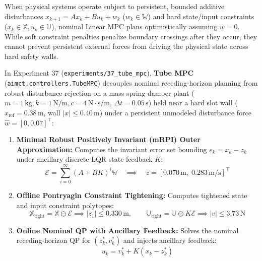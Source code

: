 \documentclass[11pt,a4paper]{article}
\begin{document}
When physical systems operate subject to persistent, bounded additive disturbances $x_{k+1} = A x_k + B u_k + w_k$ ($w_k \in \mathbb{W}$) and hard state/input constraints ($x_k \in \mathbb{X}, u_k \in \mathbb{U}$), nominal Linear MPC plans optimistically assuming $w=0$. While soft constraint penalties penalize boundary crossings after they occur, they cannot prevent persistent external forces from driving the physical state across hard safety walls.

In Experiment 37 (\texttt{experiments/37\_tube\_mpc}), \textbf{Tube MPC} (\texttt{aimct.controllers.TubeMPC}) decouples nominal receding-horizon planning from robust disturbance rejection on a mass-spring-damper plant ($m=1\,\text{kg}, k=1\,\text{N/m}, c=4\,\text{N}\cdot\text{s/m}$, $\Delta t = 0.05\,\text{s}$) held near a hard slot wall ($x_{\text{ref}} = 0.38\,\text{m}$, wall $|x| \le 0.40\,\text{m}$) under a persistent unmodeled disturbance force $\hat{w} = [0, 0.07]^\top$:
\begin{enumerate}[nosep]
  \item \textbf{Minimal Robust Positively Invariant (mRPI) Outer Approximation:} Computes the invariant error set bounding $e_k = x_k - z_k$ under ancillary discrete-LQR state feedback $K$:
  \begin{equation}
  \mathcal{E} = \sum_{i=0}^\infty (A + B K)^i \mathbb{W} \quad \implies \quad z = [0.070\,\text{m}, \; 0.283\,\text{m/s}]^\top
  \end{equation}
  \item \textbf{Offline Pontryagin Constraint Tightening:} Computes tightened state and input constraint polytopes:
  \begin{equation}
  \mathbb{X}_{\text{tight}} = \mathbb{X} \ominus \mathcal{E} \implies |z_1| \le 0.330\,\text{m}, \qquad \mathbb{U}_{\text{tight}} = \mathbb{U} \ominus K \mathcal{E} \implies |v| \le 3.73\,\text{N}
  \end{equation}
  \item \textbf{Online Nominal QP with Ancillary Feedback:} Solves the nominal receding-horizon QP for $(z_k^*, v_k^*)$ and injects ancillary feedback:
  \begin{equation}
  u_k = v_k^* + K (x_k - z_k^*)
  \end{equation}
\end{enumerate}
\end{document}
